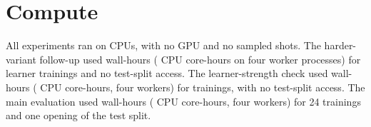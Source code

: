 \documentclass[10pt]{article}
\begin{document}
\begin{table}[H]
\centering\small
\caption{Percentage of online-DP surplus on the four validation catalogs under rebuilt transition matrices. ``Stay'' is the mean self-loop probability. Source: \texttt{figure\_data/tmlr\_transition\_robustness.csv}.}
\label{tab:transitions}

\end{table}

\section{Compute}\label{app:compute}

All experiments ran on CPUs, with no GPU and no sampled shots. The harder-variant follow-up used \rgWallHours{} wall-hours (\rgCPU{} CPU core-hours on four worker processes) for \rgModels{} learner trainings and no test-split access. The learner-strength check used \lsWallHours{} wall-hours (\lsCPU{} CPU core-hours, four workers) for \lsTrials{} trainings, with no test-split access. The main evaluation used \cfWallHours{} wall-hours (\cfCPU{} CPU core-hours, four workers) for 24 trainings and one opening of the test split.
\end{document}
